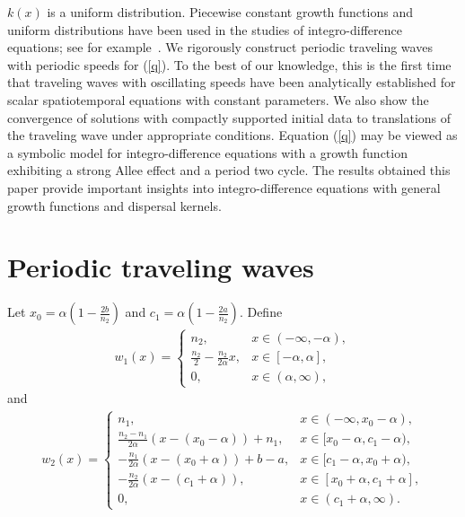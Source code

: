 \documentclass[11pt]{article}
\numberwithin{equation}{section}
\theoremstyle{definition}
\begin{document}
$k(x)$ is a uniform distribution. Piecewise constant growth functions and uniform distributions have been used in the studies of integro-difference equations; see for example~\cite{kot1, lut,otto,  pnas}. We rigorously construct periodic traveling waves with periodic speeds for (\ref{q}). To the best of our knowledge, this is the first time that traveling waves with oscillating speeds have been analytically established  for scalar spatiotemporal equations with constant parameters. We also show the convergence of solutions with compactly supported initial data to translations of the traveling wave under appropriate conditions. Equation (\ref{q}) may be viewed as a symbolic model for integro-difference equations with a growth function exhibiting a strong Allee effect and a period two cycle. The results obtained this paper provide important insights into integro-difference equations with general growth functions and dispersal kernels. 


\section{Periodic traveling waves}

Let $x_0 = \alpha \left(1-\frac{2b}{n_2}\right)$ and $c_1 = \alpha \left(1- \frac{2a}{n_2}\right)$.
Define 
\begin{equation}  \label{w1}
\begin{aligned}
w_1(x) 
= \begin{cases}
n_2, & x \in (-\infty, -\alpha), \\
\frac{n_2}{2} - \frac{n_2}{2\alpha}x, & x \in [-\alpha, \alpha] ,\\
0, & x \in (\alpha, \infty),
\end{cases}
\end{aligned} \end{equation}
and 
\begin{equation} \label{w2}
\begin{aligned}
w_2(x) 
= \begin{cases}
n_1,
& x \in (-\infty, x_0-\alpha), \\
\frac{n_2-n_1}{2\alpha}(x - (x_0 - \alpha))+n_1,
& x \in [x_0 - \alpha, 
 c_1- \alpha), \\
-\frac{n_1}{2\alpha}(x-(x_0+\alpha))+b-a,
& x \in [c_1 - \alpha, x_0 + \alpha), \\
-\frac{n_2}{2\alpha} (x - (c_1 + \alpha)),
& x \in [x_0 + \alpha, c_1 + \alpha], \\
0,
& x \in (c_1+\alpha,\infty).
\end{cases}
\end{aligned} \end{equation}
\end{document}
